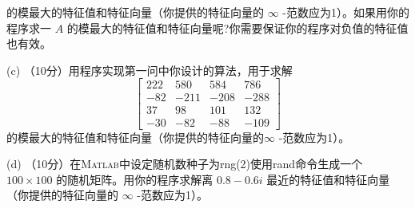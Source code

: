 \documentclass[12pt,a4paper,UTF8]{ctexart}
\begin{document}
\begin{enumerate}
          的模最大的特征值和特征向量（你提供的特征向量的 $\infty$ -范数应为1）。如果用你的程序求一 $A$ 的模最大的特征值和特征向量呢?你需要保证你的程序对负值的特征值也有效。

          (c) （10分）用程序实现第一问中你设计的算法，用于求解
          \begin{equation}
              \left[\begin{array}{rrrr}
                      222 & 580  & 584  & 786  \\
                      -82 & -211 & -208 & -288 \\
                      37  & 98   & 101  & 132  \\
                      -30 & -82  & -88  & -109
                  \end{array}\right]
          \end{equation}
          的模最大的特征值和特征向量（你提供的特征向量的$\infty$ -范数应为1）。

          (d) （10分）在\textsc{Matlab}中设定随机数种子为rng(2)使用rand命令生成一个 $100 \times 100$ 的随机矩阵。用你的程序求解离 $0.8-0.6 i$ 最近的特征值和特征向量（你提供的特征向量的 $\infty$ -范数应为1）。



\end{enumerate}
\end{document}
